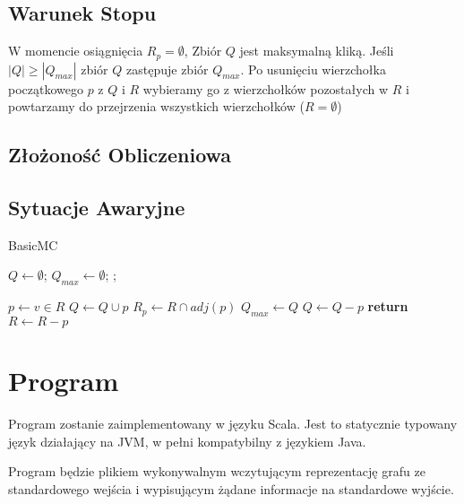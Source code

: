 \documentclass[12pt, a4paper]{article}
\begin{document}
\subsection{Warunek Stopu}

W momencie osiągnięcia $R_{p} = \emptyset$, Zbiór $Q$ jest maksymalną kliką. Jeśli $|Q| \ge |Q_{max}|$ zbiór $Q$ zastępuje zbiór $Q_{max}$. Po usunięciu wierzchołka początkowego $p$ z $Q$ i $R$ wybieramy go z wierzchołków pozostałych w $R$ i powtarzamy do przejrzenia wszystkich wierzchołków ($R = \emptyset$)

\subsection{Złożoność Obliczeniowa}

\subsection{Sytuacje Awaryjne}

\begin{algorithm}
\caption{BasicMC}\label{basicmc}
\begin{algorithmic}[1]
  
\State $Q\gets \emptyset$;
\State $Q_{max}\gets \emptyset$;
\State {};
\EndProcedure
\Statex

  \State $p\gets v\in R$
    \State $Q \gets Q \cup {p}$\label{addPToQ}
    \State $R_p \gets R \cap adj(p)$
      \State {}
      \State $Q_{max} \gets Q$
    \EndIf
    \State $Q \gets Q - {p}$
  \Else
    \textbf{ return}\label{skip}
  \EndIf
  \State $R \gets R - p$
\EndWhile
\EndProcedure

\end{algorithmic}
\end{algorithm}

\section{Program}
\label{sec-3}
Program zostanie zaimplementowany w języku Scala. Jest to statycznie typowany język działający na JVM, w pełni kompatybilny z językiem Java.

Program będzie plikiem wykonywalnym wczytującym reprezentację grafu ze standardowego wejścia i wypisującym żądane informacje na standardowe wyjście.
\end{document}
